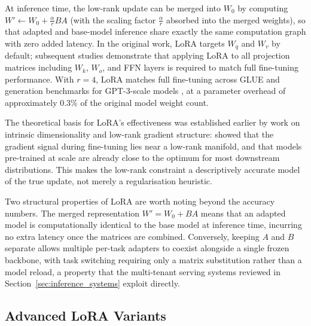 At inference time, the low-rank update can be merged into $W_0$ by computing
$W' \leftarrow W_0 + \frac{\alpha}{r}BA$ (with the scaling factor $\frac{\alpha}{r}$ absorbed into the merged weights), so that adapted and base-model inference share
exactly the same computation graph with zero added latency. In the original work, LoRA targets
$W_q$ and $W_v$ by default; subsequent studies demonstrate that applying LoRA to all
projection matrices including $W_k$, $W_o$, and FFN layers is required to match full
fine-tuning performance. With $r = 4$, LoRA matches full fine-tuning across GLUE and
generation benchmarks for GPT-3-scale models \citep{Hu2022}, at a parameter overhead of
approximately 0.3\% of the original model weight count.

The theoretical basis for LoRA's effectiveness was established earlier by work on
intrinsic dimensionality and low-rank gradient structure: \citet{ZengExpressive2024}
showed that the gradient signal during fine-tuning lies near a low-rank manifold, and
that models pre-trained at scale are already close to the optimum for most downstream
distributions. This makes the low-rank constraint a descriptively accurate model of the
true update, not merely a regularisation heuristic.

Two structural properties of LoRA are worth noting beyond the accuracy numbers. The merged
representation $W' = W_0 + BA$ means that an adapted model is computationally identical to
the base model at inference time, incurring no extra latency once the matrices are combined.
Conversely, keeping $A$ and $B$ separate allows multiple per-task adapters to coexist
alongside a single frozen backbone, with task switching requiring only a matrix substitution
rather than a model reload, a property that the multi-tenant serving systems reviewed in
Section~\ref{sec:inference_systems} exploit directly.

\subsection{Advanced LoRA Variants}
\label{sec:peft:lora_variants}

